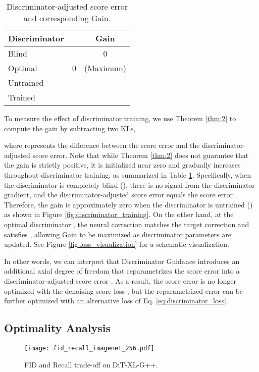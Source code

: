 \documentclass{article}
\makeatletter
\theoremstyle{plain}
\theoremstyle{definition}
\theoremstyle{remark}
\def\adl@drawiv#1#2#3{\hskip.5\tabcolsep
	\xleaders#3{#2.5\@tempdimb #1{1}#2.5\@tempdimb}#2\z@ plus1fil minus1fil\relax
	\hskip.5\tabcolsep}
\newcommand{\cdashlinelr}[1]{\noalign{\vskip\aboverulesep
		\global\let\@dashdrawstore\adl@draw
		\global\let\adl@draw\adl@drawiv}
	\cdashline{#1}
	\noalign{\global\let\adl@draw\@dashdrawstore
		\vskip\belowrulesep}}
\makeatother
\begin{document}
\begin{table}[t]
	\caption{Discriminator-adjusted score error  and corresponding Gain.}
	\label{tab:gain}
	\scriptsize
	\centering
		\begin{tabular}{lcc}
			\toprule
			Discriminator &  & Gain \\\midrule
			Blind  &  & 0 \\
			Optimal  & 0 &  (Maximum)\\\cdashlinelr{1-3}
			Untrained  &  &  \\
			Trained  &  &  \\
			\bottomrule
		\end{tabular}
\end{table}
To measure the effect of discriminator training, we use Theorem \ref{thm:2} to compute the gain by subtracting two KLs,

where  represents the difference between the score error and the discriminator-adjusted score error. Note that while Theorem \ref{thm:2} does not guarantee that the gain is strictly positive, it is initialized near zero and gradually increases throughout discriminator training, as summarized in Table \ref{tab:gain}. Specifically, when the discriminator is completely blind (), there is no signal from the discriminator gradient, and the discriminator-adjusted score error  equals the score error . Therefore, the gain is approximately zero when the discriminator is untrained () as shown in Figure \ref{fig:discriminator_training}. On the other hand, at the optimal discriminator , the neural correction  matches the target correction  and satisfies , allowing Gain to be maximized as discriminator parameters are updated. See Figure \ref{fig:loss_visualization} for a schematic visualization.

In other words, we can interpret that Discriminator Guidance introduces an additional axial degree of freedom  that reparametrizes the score error  into a discriminator-adjusted score error . As a result, the score error  is no longer optimized with the denoising score loss , but the reparametrized error  can be further optimized with an alternative loss  of Eq. \eqref{eq:discriminator_loss}.

\subsection{Optimality Analysis}\label{sec:mode_coverage}

\begin{figure}[t]
	\centering
	\texttt{[image: fid\_recall\_imagenet\_256.pdf]}
	\caption{FID and Recall trade-off on DiT-XL-G++.}
	\vskip -0.1in
	\label{fig:precision_recall}
\end{figure}
\end{document}
